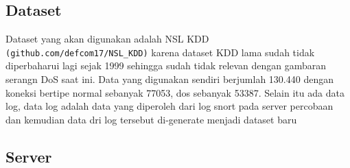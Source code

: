 \subsection{Dataset}

Dataset yang akan digunakan adalah NSL KDD \texttt{(github.com/defcom17/NSL\_KDD)} karena dataset KDD lama sudah tidak diperbaharui lagi sejak 1999 sehingga sudah tidak relevan dengan gambaran serangn DoS saat ini.
Data yang digunakan sendiri berjumlah 130.440 dengan koneksi bertipe normal sebanyak 77053, dos sebanyak 53387.
Selain itu ada data log, data log adalah data yang diperoleh dari log snort pada server percobaan dan kemudian data dri log tersebut di-generate menjadi dataset baru

\subsection{Server}
